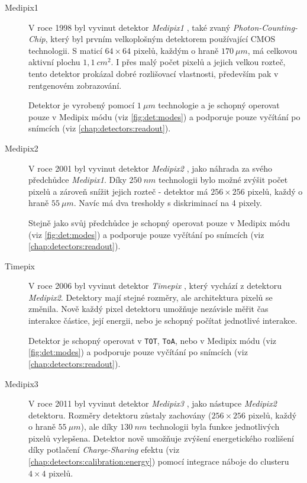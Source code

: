 \begin{description}

	\item[Medipix1] V roce 1998 byl vyvinut detektor \textit{Medipix1} \cite{medipix1}, také zvaný \textit{Photon-Counting-Chip}, který byl prvním velkoplošným detektorem používající CMOS technologii. S maticí $64\times64$ pixelů, každým o hraně $170~\mu m$, má celkovou aktivní plochu $1,1~cm^2$. I přes malý počet pixelů a jejich velkou rozteč, tento detektor prokázal dobré rozlišovací vlastnosti, především pak v rentgenovém zobrazování. 
	
	Detektor je vyrobený pomocí $1~\mu m$ technologie a je schopný operovat pouze v Medipix módu (viz \ref{fig:det:modes}) a podporuje pouze vyčítání po snímcích (viz \ref{chap:detectors:readout}).
	
	\item[Medipix2] V roce 2001 byl vyvinut detektor \textit{Medipix2} \cite{medipix2}, jako náhrada za svého předchůdce \textit{Medipix1}. Díky $250~nm$ technologii bylo možné zvýšit počet pixelů a zároveň snížit jejich rozteč - detektor má $256\times256$ pixelů, každý o hraně $55~\mu m$. Navíc má dva tresholdy s diskriminací na 4 pixely. 
	
	Stejně jako svůj předchůdce je schopný operovat pouze v Medipix módu (viz \ref{fig:det:modes}) a podporuje pouze vyčítání po snímcích (viz \ref{chap:detectors:readout}).
	
	\item[Timepix]\label{chap:detectors:medipix_overview:timepix} V roce 2006 byl vyvinut detektor \textit{Timepix} \cite{timepix}, který vychází z detektoru \textit{Medipix2}. Detektory mají stejné rozměry, ale architektura pixelů se změnila. Nově každý pixel detektoru umožňuje nezávisle měřit čas interakce částice, její energii, nebo je schopný počítat jednotlivé interakce. 
	
	Detektor je schopný operovat v \texttt{TOT}, \texttt{ToA}, nebo v Medipix módu (viz \ref{fig:det:modes}) a podporuje pouze vyčítání po snímcích (viz \ref{chap:detectors:readout}).
	
	\item[Medipix3] V roce 2011 byl vyvinut detektor \textit{Medipix3} \cite{medipix3}, jako nástupce \textit{Medipix2} detektoru. Rozměry detektoru zůstaly zachovány ($256\times256$ pixelů, každý o hraně $55~\mu m$), ale díky $130~nm$ technologii byla funkce jednotlivých pixelů vylepšena. Detektor nově umožňuje zvýšení energetického rozlišení díky potlačení \textit{Charge-Sharing} efektu (viz \ref{chap:detectors:calibration:energy}) pomocí integrace náboje do clusteru $4\times4$ pixelů. 
	

\end{description}
